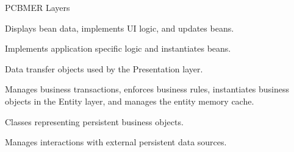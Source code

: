 \documentclass{slide}
\begin{document}
\begin{frame}{PCBMER Layers}
\large{
\begin{description}[<+->]
    \setlength\itemsep{0.5em}
    \item[Presentation] Displays bean data, implements UI logic, and updates beans.
    \item[Controller] Implements application specific logic and instantiates beans.
    \item[Bean] Data transfer objects used by the Presentation layer.
    \item[Mediator] Manages business transactions, enforces business rules, instantiates business objects in the Entity layer, and manages the entity memory cache.
    \item[Entity] Classes representing persistent business objects.
    \item[Resource] Manages interactions with external persistent data sources.
\end{description}
}
\end{frame}


\end{document}
